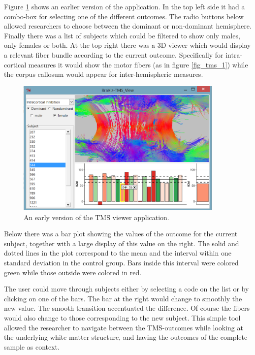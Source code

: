 Figure \ref{fig_tms_view_early} shows an earlier version of the application. In the top left side it had a combo-box for selecting one of the different outcomes. The radio buttons below allowed researchers to choose between the dominant or non-dominant hemisphere. Finally there was a list of subjects which could be filtered to show only males, only females or both. At the top right there was a 3D viewer which would display a relevant fiber bundle according to the current outcome. Specifically for intra-cortical measures it would show the motor fibers (as in figure \ref{fig_tms_1}) while the corpus callosum would appear for inter-hemispheric measures.

\begin{figure}
	\centering
		\includegraphics[width=0.90\textwidth]{figures/analysis/tms_view_early}
	\caption{An early version of the TMS viewer application.}
	\label{fig_tms_view_early}
\end{figure}

Below there was a bar plot showing the values of the outcome for the current subject, together with a large display of this value on the right. The solid and dotted lines in the plot correspond to the mean and the interval within one standard deviation in the control group. Bars inside this interval were colored green while those outside were colored in red.

The user could move through subjects either by selecting a code on the list or by clicking on one of the bars. The bar at the right would change to smoothly the new value. The smooth transition accentuated the difference. Of course the fibers would also change to those corresponding to the new subject. This simple tool allowed the researcher to navigate between the TMS-outcomes  while looking at the underlying white matter structure, and having the outcomes of the complete sample as context. 

